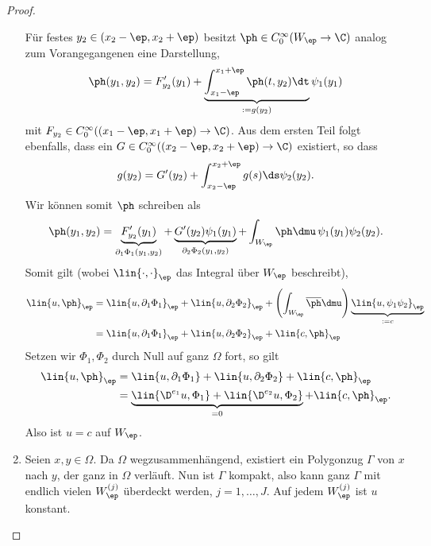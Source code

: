 \begin{proof}
\begin{proofenum}
\begin{enumerate}[label=\alph{*}),leftmargin=0pt]
Für festes $y_2\in (x_2-\ep,x_2+\ep)$ besitzt $\ph\in C_0^\infty(W_\ep\to\C)$
analog zum Vorangegangenen eine Darstellung,
\begin{align*}
\ph(y_1,y_2) = F_{y_2}'(y_1) + \underbrace{\int_{x_1-\ep}^{x_1+\ep}
\ph(t,y_2)\dt}_{:=g(y_2)} \psi_1(y_1)
\end{align*}
mit $F_{y_2}\in C_0^\infty((x_1-\ep,x_1+\ep)\to\C)$. Aus dem ersten Teil folgt
ebenfalls, dass ein $G\in C_0^\infty((x_2-\ep,x_2+\ep)\to\C)$ existiert, so dass
\begin{align*}
g(y_2) = G'(y_2) + \int_{x_2-\ep}^{x_2+\ep} g(s)\ds \psi_2(y_2).
\end{align*}
Wir können somit $\ph$ schreiben als
\begin{align*}
\ph(y_1,y_2) =
\underbrace{F_{y_2}'(y_1)}_{\partial_1 \Phi_1(y_1,y_2)}
+ \underbrace{G'(y_2)\psi_1(y_1)}_{\partial_2 \Phi_2(y_1,y_2)}
+ \int_{W_\ep} \ph\dmu\, \psi_1(y_1)\psi_2(y_2).
\end{align*}
Somit gilt (wobei $\lin{\cdot,\cdot}_\ep$ das Integral über $W_\ep$ beschreibt),
\begin{align*}
\lin{u,\ph}_\ep &= \lin{u,\partial_1 \Phi_1}_\ep
+ \lin{u,\partial_2 \Phi_2}_\ep +
\left(\int_{W_\ep}
\overline{\ph}\dmu\right)\underbrace{\lin{u,\psi_1\psi_2}_\ep}_{:=c}\\
&=\lin{u,\partial_1 \Phi_1}_\ep
+ \lin{u,\partial_2 \Phi_2}_\ep + \lin{c,\ph}_\ep
\end{align*}
Setzen wir $\Phi_1,\Phi_2$ durch Null auf ganz  $\Omega$ fort, so gilt
\begin{align*}
\lin{u,\ph}_\ep &= \lin{u,\partial_1 \Phi_1}
+ \lin{u,\partial_2 \Phi_2} +  \lin{c,\ph}_\ep
\\ &=
\underbrace{\lin{\D^{e_1}u, \Phi_1}
+ \lin{\D^{e_2}u,\Phi_2}}_{=0} + 
  \lin{c,\ph}_\ep.
\end{align*}
Also ist $u=c$ auf $W_\ep$.
\item Seien $x,y\in\Omega$. Da $\Omega$ wegzusammenhängend, existiert ein
Polygonzug $\Gamma$ von $x$ nach $y$, der ganz in $\Omega$ verläuft. Nun ist
$\Gamma$ kompakt, also kann ganz $\Gamma$ mit endlich vielen $W_\ep^{(j)}$
überdeckt werden, $j=1,\ldots,J$. Auf jedem $W_\ep^{(j)}$ ist $u$ konstant.


\end{enumerate}
\end{proofenum}
\end{proof}
